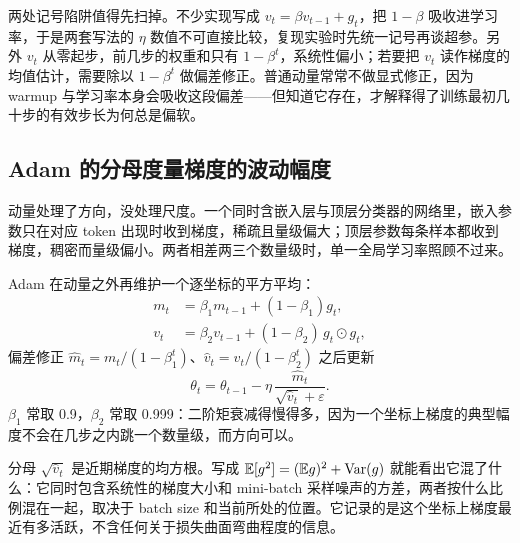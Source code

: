两处记号陷阱值得先扫掉。不少实现写成 \(v_t=\beta v_{t-1}+g_t\)，把 \(1-\beta\) 吸收进学习率，于是两套写法的 \(\eta\) 数值不可直接比较，复现实验时先统一记号再谈超参。另外 \(v_t\) 从零起步，前几步的权重和只有 \(1-\beta^t\)，系统性偏小；若要把 \(v_t\) 读作梯度的均值估计，需要除以 \(1-\beta^t\) 做偏差修正。普通动量常常不做显式修正，因为 warmup 与学习率本身会吸收这段偏差——但知道它存在，才解释得了训练最初几十步的有效步长为何总是偏软。

\subsection{Adam 的分母度量梯度的波动幅度}

动量处理了方向，没处理尺度。一个同时含嵌入层与顶层分类器的网络里，嵌入参数只在对应 token 出现时收到梯度，稀疏且量级偏大；顶层参数每条样本都收到梯度，稠密而量级偏小。两者相差两三个数量级时，单一全局学习率照顾不过来。

Adam 在动量之外再维护一个逐坐标的平方平均：
\[
\begin{aligned}
m_t&=\beta_1m_{t-1}+(1-\beta_1)g_t,\\
v_t&=\beta_2v_{t-1}+(1-\beta_2)\,g_t\odot g_t,
\end{aligned}
\]
偏差修正 \(\widehat m_t=m_t/(1-\beta_1^t)\)、\(\widehat v_t=v_t/(1-\beta_2^t)\) 之后更新
\[
\theta_t=\theta_{t-1}-\eta\,\frac{\widehat m_t}{\sqrt{\widehat v_t}+\varepsilon}.
\]
\(\beta_1\) 常取 0.9，\(\beta_2\) 常取 0.999：二阶矩衰减得慢得多，因为一个坐标上梯度的典型幅度不会在几步之内跳一个数量级，而方向可以。

分母 \(\sqrt{\widehat v_t}\) 是近期梯度的均方根。写成 \(\mathbb{E}[g^2]=(\mathbb{E} g)^2+\operatorname{Var}(g)\) 就能看出它混了什么：它同时包含系统性的梯度大小和 mini-batch 采样噪声的方差，两者按什么比例混在一起，取决于 batch size 和当前所处的位置。它记录的是这个坐标上梯度最近有多活跃，不含任何关于损失曲面弯曲程度的信息。

\begin{center}
\end{center}

